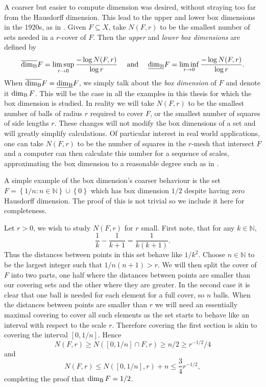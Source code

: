 A coarser but easier to compute dimension was desired, without straying too far from the Hausdorff dimension. This lead to the upper and lower box dimensions in the 1920s, as in \cite{bouligand}. Given $F\subseteq X$, take $N(F,r)$ to be the smallest number of sets needed in a $r$-cover of $F$. Then the \textit{upper} and \textit{lower box dimensions} are defined by
\[
\overline{\dim_{\textup{B}}} F = \limsup_{r \rightarrow 0} \frac{-\log N(F,r)}{\log r}   \quad \text{ and } \quad \underline{\dim_{\textup{B}}} F = \liminf_{r \rightarrow 0} \frac{-\log N(F,r)}{\log r}. 
\]
 When $\overline{\dim_{\textup{B}}} F = \underline{\dim_{\textup{B}}} F$, we simply talk about the \textit{box dimension} of $F$ and denote it $\dim_{\textup{B}} F$. This will be the case in all the examples in this thesis for which the box dimension is studied. In reality we will take $N(F,r)$ to be the smallest number of balls of radius $r$ required to cover $F$, or the smallest number of squares of side lengths $r$. These changes will not modify the box dimensions of a set and will greatly simplify calculations. Of particular interest in real world applications, one can take $N(F,r)$ to be the number of squares in the $r$-mesh that intersect $F$ and a computer can then calculate this number for a sequence of scales, approximating the box dimension to a reasonable degree such as in \cite{diieva}.

A simple example of the box dimension's coarser behaviour is the set $F = \left\{1/n \colon n \in \mathbb{N} \right\} \cup \left\{ 0\right\}$ which has box dimension $1/2$ despite having zero Hausdorff dimension. The proof of this is not trivial so we include it here for completeness. 

Let $r>0$, we wish to study $N(F,r)$ for $r$ small. First note, that for any $k \in \mathbb{N}$, 
\[
\frac{1}{k} - \frac{1}{k+1} = \frac{1}{k(k+1)}.
\]
Thus the distances between points in this set behave like $1/k^2$. Choose $n \in \mathbb{N}$ to be the largest integer such that $1/n(n+1) > r$. We will then split the cover of $F$ into two parts, one half where the distances between points are smaller than our covering sets and the other where they are greater. In the second case it is clear that one ball is needed for each element for a full cover, so $n$ balls. When the distances between points are smaller than $r$ we will need an essentially maximal covering to cover all such elements as the set starts to behave like an interval with respect to the scale $r$. Therefore covering the first section is akin to covering the interval $[0,1/n]$. Hence
\[
N(F,r) \ge N([0,1/n]\cap F,r) \ge n/2 \ge r^{-1/2}/4
\]
and
\[
N(F,r) \le N([0,1/n],r) + n \le \frac{3}{4} r^{-1/2}, 
\]
completing the proof that $\dim_{\textup{B}} F = 1/2$.


